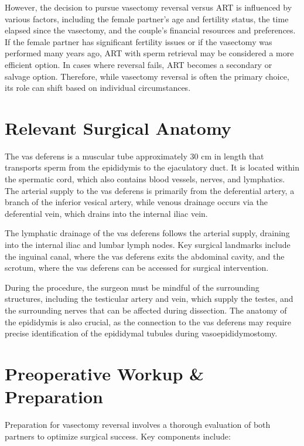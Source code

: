 However, the decision to pursue vasectomy reversal versus ART is influenced by various factors, including the female partner's age and fertility status, the time elapsed since the vasectomy, and the couple's financial resources and preferences. If the female partner has significant fertility issues or if the vasectomy was performed many years ago, ART with sperm retrieval may be considered a more efficient option. In cases where reversal fails, ART becomes a secondary or salvage option. Therefore, while vasectomy reversal is often the primary choice, its role can shift based on individual circumstances.

\section*{Relevant Surgical Anatomy}
The vas deferens is a muscular tube approximately 30 cm in length that transports sperm from the epididymis to the ejaculatory duct. It is located within the spermatic cord, which also contains blood vessels, nerves, and lymphatics. The arterial supply to the vas deferens is primarily from the deferential artery, a branch of the inferior vesical artery, while venous drainage occurs via the deferential vein, which drains into the internal iliac vein. 

The lymphatic drainage of the vas deferens follows the arterial supply, draining into the internal iliac and lumbar lymph nodes. Key surgical landmarks include the inguinal canal, where the vas deferens exits the abdominal cavity, and the scrotum, where the vas deferens can be accessed for surgical intervention. 

During the procedure, the surgeon must be mindful of the surrounding structures, including the testicular artery and vein, which supply the testes, and the surrounding nerves that can be affected during dissection. The anatomy of the epididymis is also crucial, as the connection to the vas deferens may require precise identification of the epididymal tubules during vasoepididymostomy.

\section*{Preoperative Workup \& Preparation}
Preparation for vasectomy reversal involves a thorough evaluation of both partners to optimize surgical success. Key components include:


